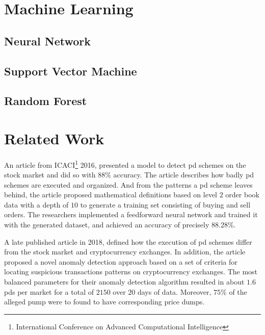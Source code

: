 \newpage
\section{Machine Learning}
\subsection{Neural Network}
\subsection{Support Vector Machine}
\subsection{Random Forest}

\section{Related Work}\label{sec:related_work}
An article from ICACI\footnote{International Conference on Advanced Computational Intelligence} 2016, \cite{P&D_stock_price_manipulation} presented a model to detect \ac{pd} schemes on the stock market and did so with $88\%$ accuracy. The article describes how badly \ac{pd} schemes are executed and organized. And from the patterns a \ac{pd} scheme leaves behind, the article proposed mathematical definitions based on level $2$ order book data with a depth of $10$ to generate a training set consisting of buying and sell orders. The researchers implemented a feedforward neural network and trained it with the generated dataset, and achieved an accuracy of precisely $88.28\%$.

A late published article in 2018, \cite{P&D_to_the_moon} defined how the execution of \ac{pd} schemes differ from the stock market and cryptocurrency exchanges. In addition, the article proposed a novel anomaly detection approach based on a set of criteria for locating suspicious transactions patterns on cryptocurrency exchanges. The most balanced parameters for their anomaly detection algorithm resulted in about $1.6$ \acp{pd} per market for a total of $2150$ over $20$ days of data. Moreover, $75\%$ of the alleged pump were to found to have corresponding price dumps. 



